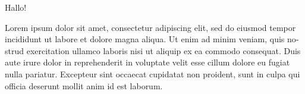 
\null\vfil
\begin{otherlanguage}{english}
\begin{center}\textsf{\textbf{\abstractname}}\end{center}

\noindent Hallo!


\end{otherlanguage}
\vfil\null



\null\vfil
\begin{otherlanguage}{ngerman}
\begin{center}\textsf{\textbf{\abstractname}}\end{center}

\noindent 

Lorem ipsum dolor sit amet, consectetur adipiscing elit, sed do eiusmod tempor incididunt ut labore et dolore magna aliqua. Ut enim ad minim veniam, quis nostrud exercitation ullamco laboris nisi ut aliquip ex ea commodo consequat. Duis aute irure dolor in reprehenderit in voluptate velit esse cillum dolore eu fugiat nulla pariatur. Excepteur sint occaecat cupidatat non proident, sunt in culpa qui officia deserunt mollit anim id est laborum.





\end{otherlanguage}
\vfil\null



